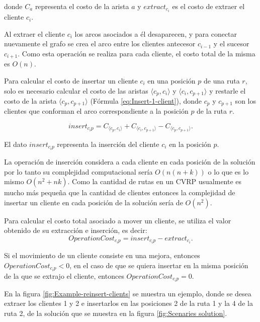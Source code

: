 \documentclass[12pt]{report}
\begin{document}
	donde $C_a$ representa el costo de la arista $a$ y $extract_{c_i}$ es el costo de extraer el cliente $c_i$.

        Al extraer el cliente $c_i$ los arcos asociados a él desaparecen, y para conectar nuevamente el grafo se crea el arco entre los clientes antecesor $c_{i-1}$ y el sucesor $c_{i+1}$. Como esta operación se realiza para cada cliente, el costo total de la misma es $O(n)$.

	Para calcular el costo de insertar un cliente $c_i$ en una posición $p$ de una ruta $r$, solo es necesario calcular el costo de las aristas $\langle c_p,c_i \rangle$ y $\langle c_i,c_{p+1} \rangle$ y restarle el costo de la arista $\langle c_p,c_{p+1} \rangle$ (Fórmula \ref{eq:Insert-1-client}), donde $c_p$ y $c_{p+1}$ son los clientes que conforman el arco correspondiente a la posición $p$ de la ruta $r$.

	\begin{equation}
		insert_{c_ip} = C_{\langle c_p,c_i \rangle} + C_{\langle c_i,c_{p+1} \rangle} - C_{\langle c_p,c_{p+1} \rangle}\textit{.}
		\label{eq:Insert-1-client}
	\end{equation}

	El dato $insert_{c_ip}$ representa la inserción del cliente $c_i$ en la posición $p$.

	La operación de inserción considera a cada cliente en cada posición de la solución por lo tanto su complejidad computacional sería $O(n(n+k))$ o lo que es lo mismo $O(n^2 + nk)$. Como la cantidad de rutas en un CVRP usualmente es mucho más pequeña que la cantidad de clientes entonces la complejidad de insertar un cliente en cada posición de la solución sería de $O(n^2)$.

	Para calcular el costo total asociado a mover un cliente, se utiliza el valor obtenido de su extracción e inserción, es decir:
	 \begin{equation}
	 	OperationCost_{c_ip} = insert_{c_ip} - extract_{c_i}.
	 	\label{eq:OperationCost-1-client}
              \end{equation}

	Si el movimiento de un cliente consiste en una mejora, entonces $OperationCost_{c_ip} < 0$, en el caso de que se quiera insertar en la misma posición de la que se extrajo el cliente, entonces $OperationCost_{c_ip} = 0$.

	En la figura \ref{fig:Example-reinsert-clients} se muestra un ejemplo, donde se desea extraer los clientes 1 y 2 e insertarlos en las posiciones 2 de la ruta 1 y la 4 de la ruta 2, de la solución que se muestra en la figura \ref{fig:Scenaries solution}.
\end{document}
